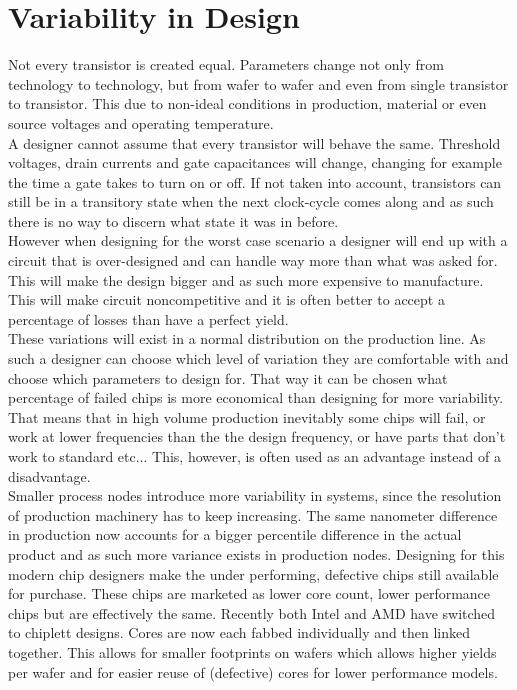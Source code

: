 \section{Variability in Design}
Not every transistor is created equal. Parameters change not only from technology to technology, but from wafer to wafer and even from single transistor to transistor. This due to non-ideal conditions in production, material or even source voltages and operating temperature.\\

A designer cannot assume that every transistor will behave the same. Threshold voltages, drain currents and gate capacitances will change, changing for example the time a gate takes to turn on or off. If not taken into account, transistors can still be in a transitory state when the next clock-cycle comes along and as such there is no way to discern what state it was in before.\\

However when designing for the worst case scenario a designer will end up with a circuit that is over-designed and can handle way more than what was asked for. This will make the design bigger and as such more expensive to manufacture. This will make circuit noncompetitive and it is often better to accept a percentage of losses than have a perfect yield.\\

These variations will exist in a normal distribution on the production line. As such a designer can choose which level of variation they are comfortable with and choose which parameters to design for. That way it can be chosen what percentage of failed chips is more economical than designing for more variability. That means that in high volume production inevitably some chips will fail, or work at lower frequencies than the the design frequency, or have parts that don't work to standard etc... This, however, is often used as an advantage instead of a disadvantage.\\

Smaller process nodes introduce more variability in systems, since the resolution of production machinery has to keep increasing. The same nanometer difference in production now accounts for a bigger percentile difference in the actual product and as such more variance exists in production nodes. Designing for this modern chip designers make the under performing, defective chips still available for purchase. These chips are marketed as lower core count, lower performance chips but are effectively the same. Recently both Intel and AMD have switched to chiplett designs. Cores are now each fabbed individually and then linked together. This allows for smaller footprints on wafers which allows higher yields per wafer and for easier reuse of (defective) cores for lower performance models. %

